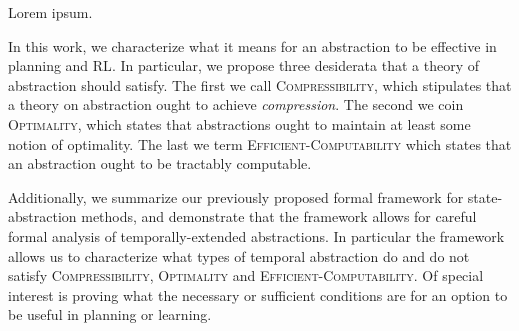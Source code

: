 Lorem ipsum.

In this work, we characterize what it means for an abstraction to be effective in planning and \ac{RL}. In particular, we propose three desiderata that a theory of abstraction should satisfy. The first we call \textsc{Compressibility}, which stipulates that a theory on abstraction ought to achieve {\it compression}. The second we coin \textsc{Optimality}, which states that abstractions ought to maintain at least some notion of optimality. The last we term \textsc{Efficient-Computability} which states that an abstraction ought to be tractably computable.

Additionally, we summarize our previously proposed formal framework for state-abstraction methods, and demonstrate that the framework allows for careful formal analysis of temporally-extended abstractions. In particular the framework allows us to characterize what types of temporal abstraction do and do not satisfy \textsc{Compressibility}, \textsc{Optimality} and \textsc{Efficient-Computability}. Of special interest is proving what the necessary or sufficient conditions are for an option to be useful in planning or learning. 